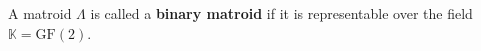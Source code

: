 A matroid $\Lambda$ is called a \textbf{binary matroid} if it is representable over the field $\mathbb{K} = \mathrm{GF}(2)$.
